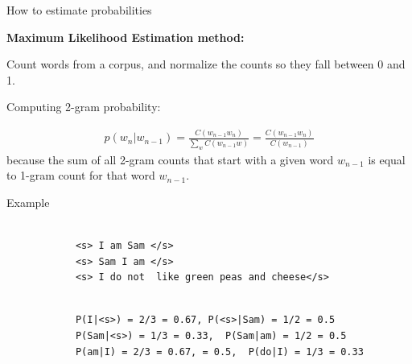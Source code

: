 \documentclass[aspectratio=169,xcolor=dvipsnames,svgnames,x11names,fleqn]{beamer}
\begin{document}
\begin{frame}{How to estimate probabilities}

\textbf{Maximum Likelihood Estimation method:}

Count words from a corpus, and normalize the counts so they fall between 0 and 1.

Computing 2-gram probability:

\begin{align*}
p(w_n|w_{n-1}) = \frac{C(w_{n-1}w_n)}{\sum_w C(w_{n-1} w)} = \frac{C(w_{n-1}w_n)}{ C(w_{n-1})} 
\end{align*}
because the sum of all 2-gram counts that start with a given word $w_{n-1}$ is equal to 1-gram count for that word $w_{n-1}$.


\end{frame}



\begin{frame}[fragile]{Example}


          \begin{verbatim}
            
            <s> I am Sam </s>
            <s> Sam I am </s>
            <s> I do not  like green peas and cheese</s>
		 \end{verbatim}
	

          \begin{verbatim}
            
            P(I|<s>) = 2/3 = 0.67, P(<s>|Sam) = 1/2 = 0.5
            P(Sam|<s>) = 1/3 = 0.33,  P(Sam|am) = 1/2 = 0.5
            P(am|I) = 2/3 = 0.67, = 0.5,  P(do|I) = 1/3 = 0.33
		 \end{verbatim}
	


\end{frame}
\end{document}
